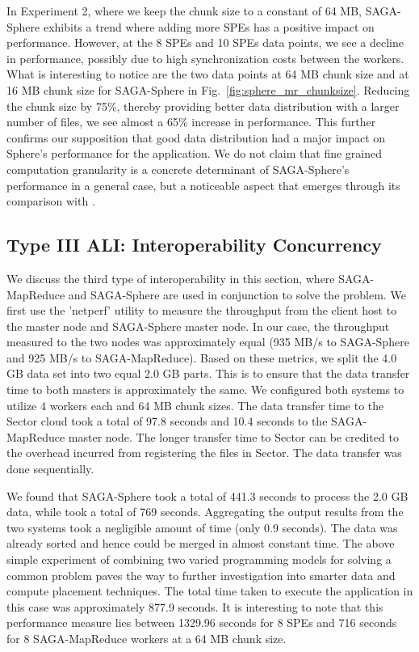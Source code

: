 \documentclass[graybox]{svmult}
\begin{document}
In Experiment 2, where we keep the chunk size to a constant of 64 MB,
SAGA-Sphere exhibits a trend where adding more SPEs has a positive
impact on performance. However, at the 8 SPEs and 10 SPEs data points,
we see a decline in performance, possibly due to high synchronization
costs between the workers. What is interesting to notice are the two
data points at 64 MB chunk size and at 16 MB chunk size for
SAGA-Sphere in Fig.~\ref{fig:sphere_mr_chunksize}.  Reducing the chunk
size by 75\%, thereby providing better data distribution with a larger
number of files, we see almost a 65\% increase in performance. This
further confirms our supposition that good data distribution had a
major impact on Sphere's performance for the \wc application. We do
not claim that fine grained computation granularity is a concrete
determinant of SAGA-Sphere's performance in a general case, but a
noticeable aspect that emerges through its comparison with
\sagamapreduce.


\subsection{Type III ALI: Interoperability Concurrency}

We discuss the third type of interoperability in this section,
where SAGA-MapReduce and SAGA-Sphere are used in conjunction 
to solve the \wc problem. We first use the 'netperf' 
utility to measure the throughput from the client host to 
the \sagamapreduce master node and SAGA-Sphere master node. 
In our case, the throughput measured to the two nodes was 
approximately equal (935 MB/s to SAGA-Sphere and 925 MB/s to SAGA-MapReduce). 
Based on these metrics, we split the 4.0 GB data set 
into two equal 2.0 GB parts. This is to ensure that the data 
transfer time to both masters is approximately the same. We 
configured both systems to utilize 4 workers each 
and 64 MB chunk sizes. The data transfer time to the Sector 
cloud took a total of 97.8 seconds and 10.4 seconds to the 
SAGA-MapReduce master node. The longer transfer time to Sector 
can be credited to the overhead incurred from registering 
the files in Sector. The data transfer was done sequentially. 

We found that SAGA-Sphere took a total of 441.3 seconds to process the
2.0 GB data, while \sagamapreduce took a total of 769
seconds. Aggregating the output results from the two systems took a
negligible amount of time (only 0.9 seconds). The data was already
sorted and hence could be merged in almost constant
time. %
The above simple experiment of combining two varied programming models
for solving a common problem paves the way to further investigation
into smarter data and compute placement techniques.  The total time
taken to execute the \wc application in this case was approximately
877.9 seconds. It is interesting to note that this performance measure
lies between 1329.96 seconds for 8 SPEs and 716 seconds for 8
SAGA-MapReduce workers at a 64 MB chunk size.
\end{document}
